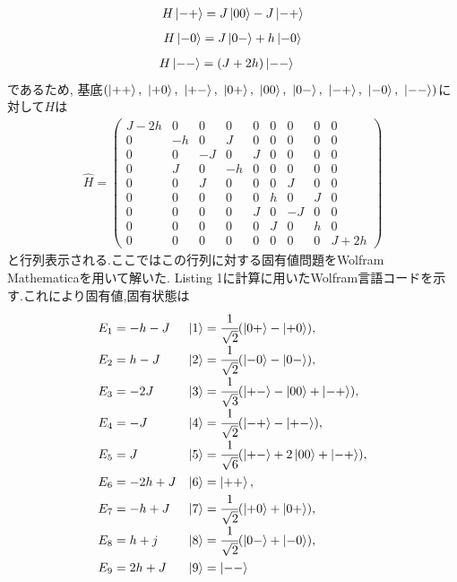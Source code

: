 \documentclass[uplatex,a4j,11pt,dvipdfmx]{jsarticle}
\begin{document}
\begin{align}
    H\Ket{-+}=J\Ket{00}-J\Ket{-+}
\end{align}
\begin{align}
  H\Ket{-0}=J\Ket{0-}+h\Ket{-0}
\end{align}
\begin{align}
  \begin{split}
    H\Ket{--}&=(J+2h)\Ket{--}
  \end{split}
\end{align}
であるため, 基底$\left(
  \Ket{++},\ \Ket{+0},\ \Ket{+-},\ \Ket{0+},\ \Ket{00},\ \Ket{0-},\ \Ket{-+},\ \Ket{-0},\ \Ket{--}
\right)$に対して$H$は
\begin{align}
  \hat{H}=\begin{pmatrix}
    J - 2 h& 0& 0& 0& 0& 0& 0& 0& 0\\
    0& -h& 0& J& 0& 0& 0& 0& 0\\
    0& 0& -J& 0& J& 0& 0& 0& 0\\
    0& J& 0& -h& 0& 0& 0& 0& 0\\
    0& 0& J& 0& 0& 0& J& 0& 0\\
    0& 0& 0& 0& 0& h& 0& J& 0\\
    0& 0& 0& 0& J& 0& -J& 0& 0\\
    0& 0& 0& 0& 0& J& 0& h& 0\\
    0& 0& 0& 0& 0& 0& 0& 0& J + 2 h
  \end{pmatrix}
\end{align}
と行列表示される.ここではこの行列に対する固有値問題をWolfram Mathematicaを用いて解いた.
Listing 1に計算に用いたWolfram言語コードを示す.これにより固有値,固有状態は
\begin{align}
  \renewcommand{\arraystretch}{1.5}
  \begin{array}{ll}
    E_1=-h-J&\Ket{1}=\cfrac{1}{\sqrt{2}}(\Ket{0+}-\Ket{+0}),\\
    E_2=h-J&\Ket{2}=\cfrac{1}{\sqrt{2}}(\Ket{-0}-\Ket{0-}),\\
    E_3=-2J&\Ket{3}=\cfrac{1}{\sqrt{3}}(\Ket{+-}-\Ket{00}+\Ket{-+}),\\
    E_4=-J&\Ket{4}=\cfrac{1}{\sqrt{2}}(\Ket{-+}-\Ket{+-}),\\
    E_5=J&\Ket{5}=\cfrac{1}{\sqrt{6}}(\Ket{+-}+2\Ket{00}+\Ket{-+}),\\
    E_6=-2h+J&\Ket{6}=\Ket{++},\\
    E_7=-h+J&\Ket{7}=\cfrac{1}{\sqrt{2}}(\Ket{+0}+\Ket{0+}),\\
    E_8=h+j&\Ket{8}=\cfrac{1}{\sqrt{2}}(\Ket{0-}+\Ket{-0}),\\
    E_9=2h+J&\Ket{9}=\Ket{--}
  \end{array}
\end{align}
\end{document}
